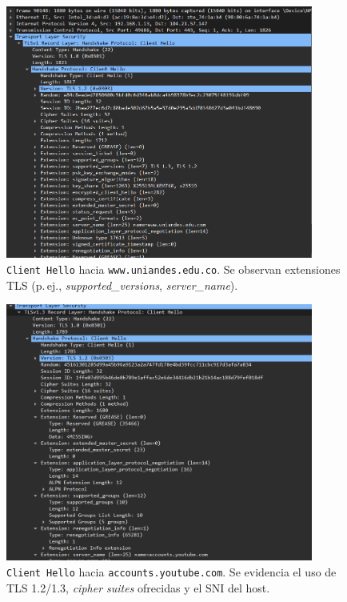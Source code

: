 \documentclass[10pt]{article}
\begin{document}
\begin{figure}[H]
    \centering
    \includegraphics[width=0.9\textwidth]{lab-02-screenshots/8.5-CapaAplicacion-HTTPS.png}
    \caption{\texttt{Client Hello} hacia \texttt{www.uniandes.edu.co}. Se observan extensiones TLS (p.\,ej., \textit{supported\_versions}, \textit{server\_name}).}
\end{figure}

\begin{figure}[H]
    \centering
    \includegraphics[width=0.9\textwidth]{lab-02-screenshots/8.5-CapaAplicacion-Youtube.png}
    \caption{\texttt{Client Hello} hacia \texttt{accounts.youtube.com}. Se evidencia el uso de TLS 1.2/1.3, \textit{cipher suites} ofrecidas y el SNI del host.}
\end{figure}
\end{document}
